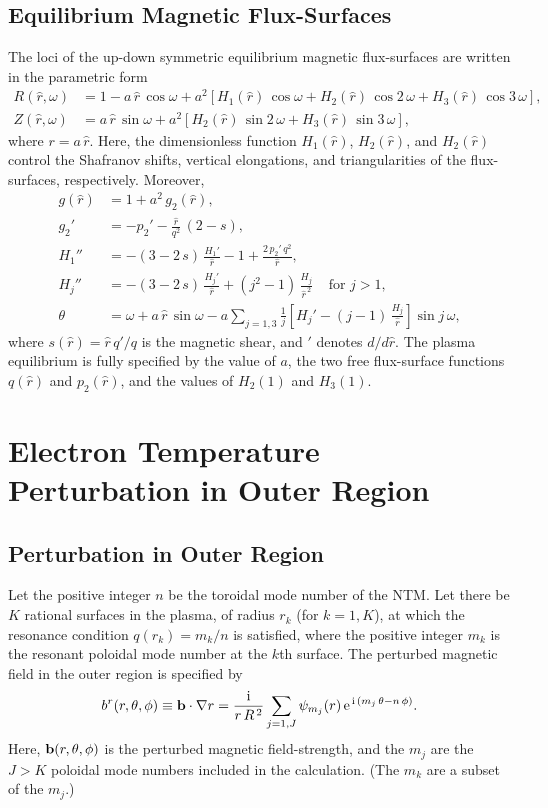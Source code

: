 \documentclass[12pt,prb,aps]{revtex4-1}
\begin{document}
\subsection{Equilibrium Magnetic Flux-Surfaces}
The loci of the up-down symmetric equilibrium magnetic flux-surfaces are written in the parametric form\,\cite{tear5}
\begin{align}
R(\hat{r},\omega) &= 1 -a\,\hat{r}\,\cos\omega + a^{2}\left[H_1(\hat{r})\,\cos \omega + H_2(\hat{r})\,\cos 2\,\omega+H_3(\hat{r})\,\cos 3\,\omega\right], \label{e19x}\\[0.5ex]
Z(\hat{r},\omega)&= a\,\hat{r}\,\sin\omega +a^{2}\left[H_2(\hat{r})\,\sin 2\,\omega+H_3(\hat{r})\,\sin 3\,\omega\right], \label{e20x}
\end{align}
where  $r=a\,\hat{r}$. 
Here, the dimensionless function $H_1(\hat{r})$, $H_2(\hat{r})$, and $H_2(\hat{r})$ control the Shafranov shifts, vertical elongations, and  triangularities of
the flux-surfaces, respectively. 
Moreover,\cite{exp}
\begin{align}
g(\hat{r}) &= 1+ a^2\,g_2(\hat{r}),\\[0.5ex]
g_2'&= -p_2' - \frac{\hat{r}}{q^2}\,(2-s),\\[0.5ex]
H_1''&= -(3-2\,s)\,\frac{H_1' }{\hat{r}}-1+\frac{2\,p_2'\,q^2}{\hat{r}},\label{e27}\\[0.5ex]
H_j''&= -(3-2\,s)\,\frac{H_j'}{\hat{r}}+(j^2-1)\,\frac{H_j}{\hat{r}^{\,2}}~~~~~\mbox{for $j>1$},\label{e33x}\\[0.5ex]
\theta &= \omega+a\,\hat{r}\,\sin\omega - a\sum_{j=1,3}\frac{1}{j}\left[H_j'-(j-1)\,\frac{H_j}{\hat{r}}\right]\sin j\,\omega,
\end{align}
where $s(\hat{r}) = \hat{r}\,q'/q$ is the magnetic shear, and $'$ denotes $d/d\hat{r}$. The plasma equilibrium is fully specified by the value of $a$, the two free
flux-surface functions $q(\hat{r})$ and $p_2(\hat{r})$, and the values of $H_2(1)$ and $H_3(1)$. 

\section{Electron Temperature Perturbation in Outer Region}\label{s3}
\subsection{Perturbation in Outer Region}
Let the positive integer $n$ be the toroidal mode number of the NTM. Let there be $K$ rational surfaces in the plasma, of radius $r_k$ (for $k=1,K$),  at which the resonance condition
$q(r_k) = m_k/n$ is satisfied, where the positive integer $m_k$ is the resonant poloidal mode number at the $k$th surface. The perturbed magnetic field in the outer region is specified by\,\cite{tear9,tear10}
\begin{equation}
b^r(r,\theta,\phi)\equiv {\bf b}\cdot\nabla r = \frac{{\rm i}}{r\,R^{\,2}}\sum_{j=1,J} \psi_{m_j}(r)\,{\rm e}^{\,{\rm i}\,(m_j\,\theta-n\,\phi)}.
\end{equation}
Here, ${\bf b}(r,\theta,\phi)$ is the perturbed magnetic field-strength, and the $m_j$ are the  $J>K$ poloidal mode numbers included in the calculation. (The $m_k$ are a subset of the $m_j$.) 
\end{document}
